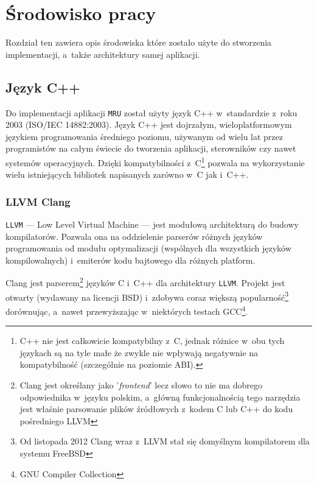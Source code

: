 \chapter{Środowisko pracy}
\label{srodowisko}
\par
Rozdział ten zawiera opis środowiska które zostało użyte do stworzenia implementacji, a~także architektury samej aplikacji.

\section{Język C++}
\par
Do implementacji aplikacji \texttt{MRU} został użyty język C++ w~standardzie z~roku 2003 (ISO/IEC 14882:2003).
Język C++ jest dojrzałym, wieloplatformowym językiem programowania średniego poziomu, używanym od wielu lat przez programistów na całym świecie do tworzenia aplikacji, sterowników czy nawet systemów operacyjnych. Dzięki kompatybilności z~C\footnote{C++ nie jest całkowicie kompatybilny z~C, jednak różnice w~obu tych językach są na tyle małe że zwykle nie wpływają negatywnie na kompatybilność (szczególnie na poziomie ABI).} pozwala na wykorzystanie wielu istniejących bibliotek napisanych zarówno w~C jak i~C++\cite{thinking-in-cpp}.

\subsection{LLVM Clang}
\par
\texttt{LLVM} --- Low Level Virtual Machine --- jest modułową architekturą do budowy kompilatorów. Pozwala ona na oddzielenie parserów różnych języków programowania od modułu optymalizacji (wspólnych dla wszystkich języków kompilowalnych) i~emiterów kodu bajtowego dla różnych platform.

\par
Clang jest parserem\footnote{Clang jest określany jako '\textit{frontend}' lecz słowo to nie ma dobrego odpowiednika w~języku polskim, a~główną funkcjonalnością tego narzędzia jest właśnie parsowanie plików źródłowych z~kodem C lub C++ do kodu pośredniego LLVM} języków C i~C++ dla architektury \texttt{LLVM}. Projekt jest otwarty (wydawany na licencji BSD) i~zdobywa coraz większą popularność\footnote{Od listopada 2012 Clang wraz z~LLVM stał się domyślnym kompilatorem dla systemu FreeBSD} dorównując, a~nawet przewyższając w~niektórych testach GCC\footnote{GNU Compiler Collection}.


